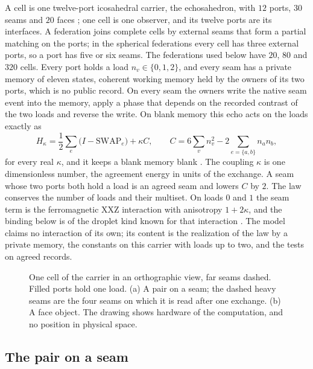 A cell is one twelve-port icosahedral carrier, the echosahedron, with $12$ ports, $30$
seams and $20$ faces \cite{ophmicro}; one cell is one observer, and its twelve ports are
its interfaces. A federation joins complete cells by external
seams that form a partial matching on the ports; in the spherical federations every
cell has three external ports, so a port has five or six seams. The federations used
below have $20$, $80$ and $320$ cells. Every port holds a load $n_v\in\{0,1,2\}$, and
every seam has a private memory of eleven states, coherent working memory held by the
owners of its two ports, which is no public record. On every seam the owners write the
native seam event into the memory, apply a phase that depends on the recorded contrast
of the two loads and reverse the write. On blank memory this echo acts on the loads
exactly as
\begin{equation}
 H_\kappa=\frac12\sum_e\bigl(I-\mathrm{SWAP}_e\bigr)+\kappa C,\qquad
 C=6\sum_v n_v^2-2\sum_{e=\{a,b\}}n_an_b,
 \label{eq:cms-law}
\end{equation}
for every real $\kappa$, and it keeps a blank memory blank \cite{ophmodel}. The coupling
$\kappa$ is one dimensionless number, the agreement energy in units of the exchange. A
seam whose two ports both hold a load is an agreed seam and lowers $C$ by $2$. The law
conserves the number of loads and their multiset. On loads $0$ and $1$ the seam term is
the ferromagnetic XXZ interaction with anisotropy $1+2\kappa$, and the binding below is
of the droplet kind known for that interaction
\cite{nachtergaele2001,fischbacher2018}. The model claims no interaction of its own;
its content is the realization of the law by a private memory, the constants on this
carrier with loads up to two, and the tests on agreed records.

\begin{figure}[!htb]
\centering

\caption{One cell of the carrier in an orthographic view, far seams dashed.
Filled ports hold one load. (a) A pair on a seam; the dashed heavy seams are the four
seams on which it is read after one exchange. (b) A face object. The drawing shows
hardware of the computation, and no position in physical space.}
\label{fig:cms-cell}
\end{figure}

\subsection{The pair on a seam}

